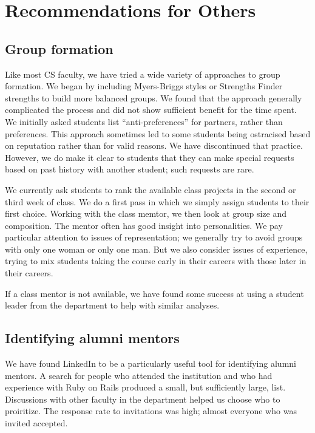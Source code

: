 \section{Recommendations for Others}

\subsection{Group formation}

Like most CS faculty, we have tried a wide variety of approaches
to group formation.  We began by including Myers-Briggs styles or
Strengths Finder strengths to build more balanced groups.  We found
that the approach generally complicated the process and did not
show sufficient benefit for the time spent.  We initially asked
students list ``anti-preferences'' for partners, rather than
preferences.  This approach sometimes led to some students being
ostracised based on reputation rather than for valid reasons.  We
have discontinued that practice.  However, we do make it clear to
students that they can make special requests based on past history
with another student; such requests are rare.

We currently ask students to rank the available class projects in
the second or third week of class.  We do a first pass in which we
simply assign students to their first choice.  Working with the
class memtor, we then look at group size and composition.  The
mentor often has good insight into personalities.  We pay particular
attention to issues of representation; we generally try to avoid
groups with only one woman or only one man.  But we also consider
issues of experience, trying to mix students taking the course early
in their careers with those later in their careers.

If a class mentor is not available, we have found some success at
using a student leader from the department to help with similar
analyses.

\subsection{Identifying alumni mentors}

We have found LinkedIn to be a particularly useful tool for identifying
alumni mentors.  A search for people who attended the institution and
who had experience with Ruby on Rails produced a small, but sufficiently
large, list.  Discussions with other faculty in the department helped
us choose who to proiritize.  The response rate to invitations was high;
almost everyone who was invited accepted.

